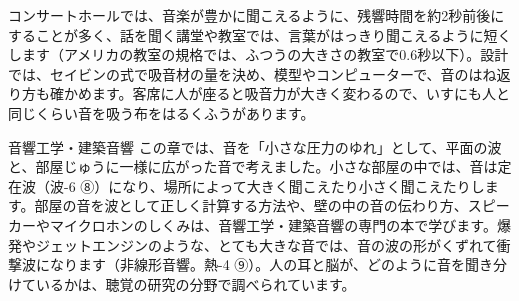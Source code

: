 \begin{phkougaku}
コンサートホールでは、音楽が豊かに聞こえるように、残響時間を約2秒前後にすることが多く、話を聞く講堂や教室では、言葉がはっきり聞こえるように短くします（アメリカの教室の規格では、ふつうの大きさの教室で0.6秒以下）。設計では、セイビンの式で吸音材の量を決め、模型やコンピューターで、音のはね返り方も確かめます。客席に人が座ると吸音力が大きく変わるので、いすにも人と同じくらい音を吸う布をはるくふうがあります。
\end{phkougaku}

\begin{phsaki}{音響工学・建築音響}
この章では、音を「小さな圧力のゆれ」として、平面の波と、部屋じゅうに一様に広がった音で考えました。小さな部屋の中では、音は定在波（波-6 ⑧）になり、場所によって大きく聞こえたり小さく聞こえたりします。部屋の音を波として正しく計算する方法や、壁の中の音の伝わり方、スピーカーやマイクロホンのしくみは、音響工学・建築音響の専門の本で学びます。爆発やジェットエンジンのような、とても大きな音では、音の波の形がくずれて衝撃波になります（非線形音響。熱-4 ⑨）。人の耳と脳が、どのように音を聞き分けているかは、聴覚の研究の分野で調べられています。
\end{phsaki}

